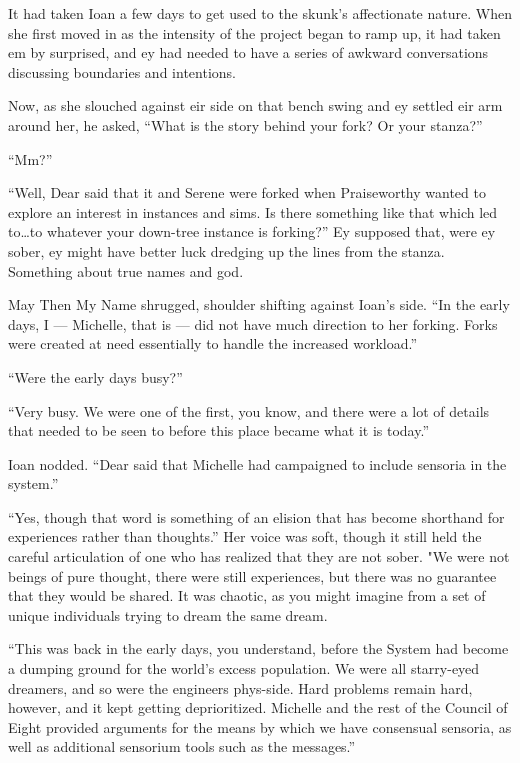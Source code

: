 It had taken Ioan a few days to get used to the skunk's affectionate nature. When she first moved in as the intensity of the project began to ramp up, it had taken em by surprised, and ey had needed to have a series of awkward conversations discussing boundaries and intentions.

Now, as she slouched against eir side on that bench swing and ey settled eir arm around her, he asked, ``What is the story behind your fork? Or your stanza?''

``Mm?''

``Well, Dear said that it and Serene were forked when Praiseworthy wanted to explore an interest in instances and sims. Is there something like that which led to\ldots to whatever your down-tree instance is forking?'' Ey supposed that, were ey sober, ey might have better luck dredging up the lines from the stanza. Something about true names and god.

May Then My Name shrugged, shoulder shifting against Ioan's side. ``In the early days, I — Michelle, that is — did not have much direction to her forking. Forks were created at need essentially to handle the increased workload.''

``Were the early days busy?''

``Very busy. We were one of the first, you know, and there were a lot of details that needed to be seen to before this place became what it is today.''

Ioan nodded. ``Dear said that Michelle had campaigned to include sensoria in the system.''

``Yes, though that word is something of an elision that has become shorthand for experiences rather than thoughts.'' Her voice was soft, though it still held the careful articulation of one who has realized that they are not sober. "We were not beings of pure thought, there were still experiences, but there was no guarantee that they would be shared. It was chaotic, as you might imagine from a set of unique individuals trying to dream the same dream.

``This was back in the early days, you understand, before the System had become a dumping ground for the world's excess population. We were all starry-eyed dreamers, and so were the engineers phys-side. Hard problems remain hard, however, and it kept getting deprioritized. Michelle and the rest of the Council of Eight provided arguments for the means by which we have consensual sensoria, as well as additional sensorium tools such as the messages.''


